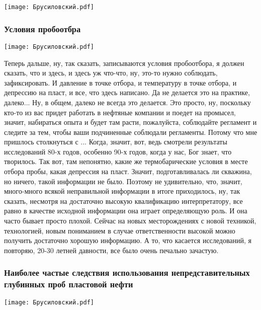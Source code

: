 \documentclass[main.tex]{subfiles}
\begin{document}
\begin{center}
\texttt{[image: Брусиловский.pdf]}
\end{center}



\subsubsection{Условия пробоотбра}

\begin{center}
\texttt{[image: Брусиловский.pdf]}
\end{center}

Теперь дальше, ну, так сказать, записываются условия пробоотбора, я должен сказать, что и здесь, и здесь уж что-что, ну, это-то нужно соблюдать, зафиксировать.
И давление в точке отбора, и температуру в точке отбора, и депрессию на пласт, и все, что здесь написано.
Да не делается это на практике, далеко...
Ну, в общем, далеко не всегда это делается.
Это просто, ну, поскольку кто-то из вас придет работать в нефтяные компании и поедет на промысел, значит, набираться опыта и будет там расти, пожалуйста, соблюдайте регламент и следите за тем, чтобы ваши подчиненные соблюдали регламенты.
Потому что мне пришлось столкнуться с ...
Когда, значит, вот, ведь смотрели результаты исследований 80-х годов, особенно 90-х годов, когда у нас, Бог знает, что творилось.
Так вот, там непонятно, какие же термобарические условия в месте отбора пробы, какая депрессия на пласт.
Значит, подготавливалась ли скважина, но ничего, такой информации не было.
Поэтому не удивительно, что, значит, много-много всякой неправильной информации в итоге приходилось, ну, так сказать, несмотря на достаточно высокую квалификацию интерпретатору, все равно в качестве исходной информации она играет определяющую роль.
И она часто бывает просто плохой.
Сейчас на новых месторождениях с новой техникой, технологией, новым пониманием в случае ответственности высокой можно получить достаточно хорошую информацию.
А то, что касается исследований, я повторяю, 20-30 летней давности, все было очень печально зачастую.

\subsubsection{Наиболее частые следствия использования непредставительных глубинных проб пластовой нефти}

\begin{center}
\texttt{[image: Брусиловский.pdf]}
\end{center}
\end{document}
